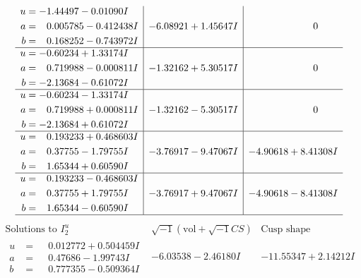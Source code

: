 \documentclass[1p]{elsarticle_modified}
\theoremstyle{definition}
\newcommand{\I}{\sqrt{-1}}
\begin{document}
$$\begin{array}{c|c|c}
\begin{aligned}
u &= -1.44497 - 0.01090 I \\
a &= \phantom{-}0.005785 - 0.412438 I \\
b &= \phantom{-}0.168252 - 0.743972 I\end{aligned}
 & -6.08921 + 1.45647 I & \phantom{-0.000000 } 0 \\ \hline\begin{aligned}
u &= -0.60234 + 1.33174 I \\
a &= \phantom{-}0.719988 - 0.000811 I \\
b &= -2.13684 - 0.61072 I\end{aligned}
 & -1.32162 + 5.30517 I & \phantom{-0.000000 } 0 \\ \hline\begin{aligned}
u &= -0.60234 - 1.33174 I \\
a &= \phantom{-}0.719988 + 0.000811 I \\
b &= -2.13684 + 0.61072 I\end{aligned}
 & -1.32162 - 5.30517 I & \phantom{-0.000000 } 0 \\ \hline\begin{aligned}
u &= \phantom{-}0.193233 + 0.468603 I \\
a &= \phantom{-}0.37755 - 1.79755 I \\
b &= \phantom{-}1.65344 + 0.60590 I\end{aligned}
 & -3.76917 - 9.47067 I & -4.90618 + 8.41308 I \\ \hline\begin{aligned}
u &= \phantom{-}0.193233 - 0.468603 I \\
a &= \phantom{-}0.37755 + 1.79755 I \\
b &= \phantom{-}1.65344 - 0.60590 I\end{aligned}
 & -3.76917 + 9.47067 I & -4.90618 - 8.41308 I\\
 \hline 
 \end{array}$$\newpage$$\begin{array}{c|c|c}  
\text{Solutions to }I^u_{2}& \I (\text{vol} + \sqrt{-1}CS) & \text{Cusp shape}\\
 \hline 
\begin{aligned}
u &= \phantom{-}0.012772 + 0.504459 I \\
a &= \phantom{-}0.47686 - 1.99743 I \\
b &= \phantom{-}0.777355 - 0.509364 I\end{aligned}
 & -6.03538 - 2.46180 I & -11.55347 + 2.14212 I \\ \hline\begin{aligned}

\end{aligned}
\end{array}$$
\end{document}
